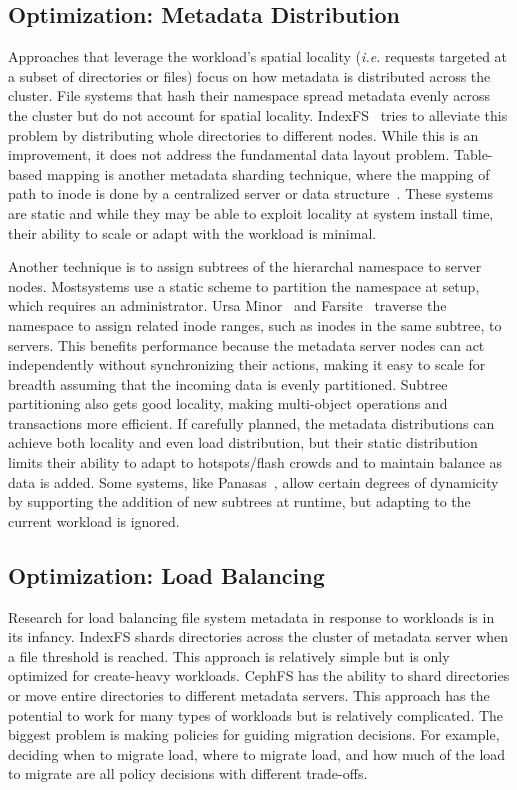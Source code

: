 \subsection{Optimization: Metadata Distribution}

Approaches that leverage the workload's spatial locality ({\it i.e.} requests
targeted at a subset of directories or files) focus on how metadata is
distributed across the cluster. File systems that hash their namespace spread
metadata evenly across the cluster but do not account for spatial locality.
IndexFS~\cite{patil:fast2011-giga+} tries to alleviate this problem by
distributing whole directories to different nodes.  While this is an
improvement, it does not address the fundamental data layout problem.
Table-based mapping is another metadata sharding technique, where the mapping
of path to inode is done by a centralized server or data
structure~\cite{xing:sc2009-skyfs, hildebrand:msst2005-pnfs,
thomson:fast2015-calvinfs}. These systems are static and while they may be able
to exploit locality at system install time, their ability to scale or adapt
with the workload is minimal.

Another technique is to assign subtrees of the hierarchal namespace to server
nodes. Mostsystems use a static scheme to partition the namespace at setup,
which requires an administrator. Ursa Minor~\cite{sinnamohideen:atc2010-ursa}
and Farsite~\cite{doucer:osdi2006-farsite-dir} traverse the namespace to assign
related inode ranges, such as inodes in the same subtree, to servers. This
benefits performance because the metadata server nodes can act independently
without synchronizing their actions, making it easy to scale for breadth
assuming that the incoming data is evenly partitioned.  Subtree partitioning
also gets good locality, making multi-object operations and transactions more
efficient. If carefully planned, the metadata distributions can achieve both
locality and even load distribution, but their static distribution limits their
ability to adapt to hotspots/flash crowds and to maintain balance as data is
added.  Some systems, like Panasas~\cite{welch:fast2008-panasas}, allow certain
degrees of dynamicity by supporting the addition of new subtrees at runtime,
but adapting to the current workload is ignored. 

\subsection{Optimization: Load Balancing}

Research for load balancing file system metadata in response to workloads is in
its infancy.  IndexFS shards directories across the cluster of metadata server
when a file threshold is reached. This approach is relatively simple but is
only optimized for create-heavy workloads. CephFS has the ability to shard
directories or move entire directories to different metadata servers. This
approach has the potential to work for many types of workloads but is
relatively complicated.  The biggest problem is making policies for guiding
migration decisions. For example, deciding when to migrate load, where to
migrate load, and how much of the load to migrate are all policy decisions with
different trade-offs.
